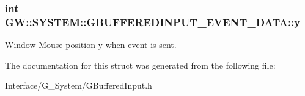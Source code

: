 \subsubsection[{\texorpdfstring{y}{y}}]{\setlength{\rightskip}{0pt plus 5cm}int G\+W\+::\+S\+Y\+S\+T\+E\+M\+::\+G\+B\+U\+F\+F\+E\+R\+E\+D\+I\+N\+P\+U\+T\+\_\+\+E\+V\+E\+N\+T\+\_\+\+D\+A\+T\+A\+::y}\hypertarget{structGW_1_1SYSTEM_1_1GBUFFEREDINPUT__EVENT__DATA_a68facd2e2754c908ecf8b8ef4ce34e08}{}\label{structGW_1_1SYSTEM_1_1GBUFFEREDINPUT__EVENT__DATA_a68facd2e2754c908ecf8b8ef4ce34e08}
Window Mouse position y when event is sent. 

The documentation for this struct was generated from the following file\+:\begin{DoxyCompactItemize}
\item 
Interface/\+G\+\_\+\+System/G\+Buffered\+Input.\+h\end{DoxyCompactItemize}
